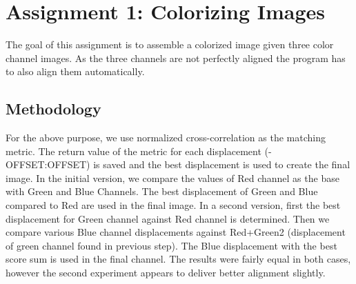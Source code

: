 \section{Assignment 1: Colorizing Images}
\label{sec:assignment1}

The goal of this assignment is to assemble a colorized image given three color channel images. As the three channels are not perfectly aligned the program has to also align them automatically.


\subsection{Methodology}

For the above purpose, we use normalized cross-correlation as the matching metric. The return value of the metric for each displacement (-OFFSET:OFFSET) is saved and the best displacement is used to create the final image.
In the initial version, we compare the values of Red channel as the base with Green and Blue Channels. The best displacement of Green and Blue compared to Red are used in the final image.
In a second version, first the best displacement for Green channel against Red channel is determined. Then we compare various Blue channel displacements against Red+Green2 (displacement of green channel found in previous step). The Blue displacement with the best score sum is used in the final channel.
The results were fairly equal in both cases, however the second experiment appears to deliver better alignment slightly.




